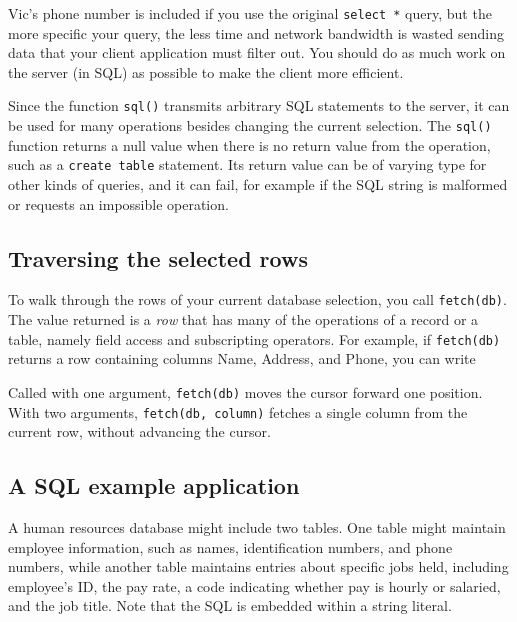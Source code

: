 
Vic's phone number is included if you use the original
\texttt{select *} query, but the more specific your query, the less
time and network bandwidth is wasted sending data that your client
application must filter out. You should do as much work on the server
(in SQL) as possible to make the client more efficient.

Since the function \texttt{sql()} transmits arbitrary SQL statements to
the server, it can be used for many operations besides changing the
current selection. The \texttt{sql()} function returns a null value
when there is no return value from the operation, such as a
\texttt{create table} statement. Its return value can be of varying
type for other kinds of queries, and it can fail, for example if the
SQL string is malformed or requests an impossible operation.

\subsection{Traversing the selected rows}

To walk through the rows of your current database selection, you call
\texttt{fetch(db)}. The value returned is a
\textit{row} that has many of the operations of a record or a table,
namely field access and subscripting operators. For example, if
\texttt{fetch(db)} returns a row containing columns Name, Address, and
Phone, you can write


Called with one argument, \texttt{fetch(db)} moves the cursor forward
one position. With two arguments, \texttt{fetch(db, column)} fetches a
single column from the current row, without advancing the cursor.

\subsection{A SQL example application}

A human resources database might include two tables. One
table might maintain employee information, such as names,
identification numbers, and phone numbers, while another table
maintains entries about specific jobs held, including
employee's ID, the pay rate, a code indicating whether
pay is hourly or salaried, and the job title. Note that the SQL is
embedded within a string literal.

